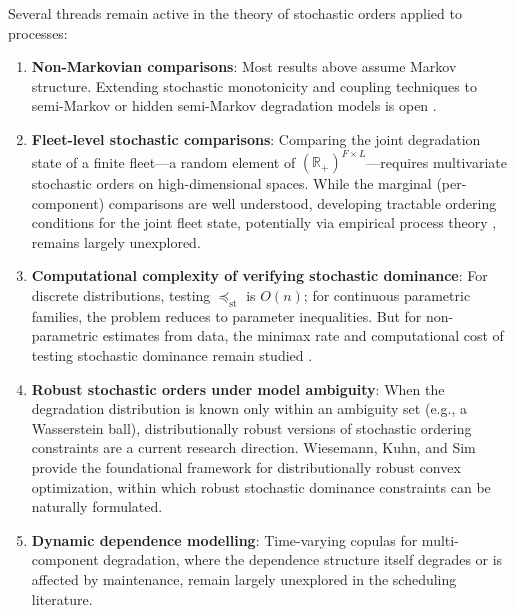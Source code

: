 \documentclass[11pt,a4paper]{article}
\theoremstyle{plain}
\theoremstyle{definition}
\theoremstyle{remark}
\begin{document}
Several threads remain active in the theory of stochastic orders applied to
processes:

%

\begin{enumerate}
  \item \textbf{Non-Markovian comparisons}: Most results above assume Markov structure.
    Extending stochastic monotonicity and coupling techniques to
    semi-Markov or hidden semi-Markov degradation models is open
    \cite{limnios2001}.
  \item \textbf{Fleet-level stochastic comparisons}: Comparing the joint degradation
    state of a finite fleet---a random element of $(\mathbb{R}_+)^{F \times L}$---requires
    multivariate stochastic orders on high-dimensional spaces.  While the marginal
    (per-component) comparisons are well understood, developing tractable ordering
    conditions for the joint fleet state, potentially via empirical process theory
    \cite{vandervaartwellner1996}, remains largely unexplored.
  \item \textbf{Computational complexity of verifying stochastic dominance}:
    For discrete distributions, testing $\preceq_{\mathrm{st}}$ is $O(n)$;
    for continuous parametric families, the problem reduces to parameter
    inequalities.  But for non-parametric estimates from data, the minimax
    rate and computational cost of testing stochastic dominance remain studied
    \cite{barrettdonald2003}.
  \item \textbf{Robust stochastic orders under model ambiguity}:
    When the degradation distribution is known only within an ambiguity set
    (e.g., a Wasserstein ball), distributionally robust versions of stochastic
    ordering constraints are a current research direction.
    Wiesemann, Kuhn, and Sim~\cite{wiesemann2014} provide the foundational
    framework for distributionally robust convex optimization, within which
    robust stochastic dominance constraints can be naturally formulated.
  \item \textbf{Dynamic dependence modelling}: Time-varying copulas for
    multi-component degradation, where the dependence structure itself degrades
    or is affected by maintenance, remain largely unexplored in the scheduling
    literature.
\end{enumerate}
\end{document}
